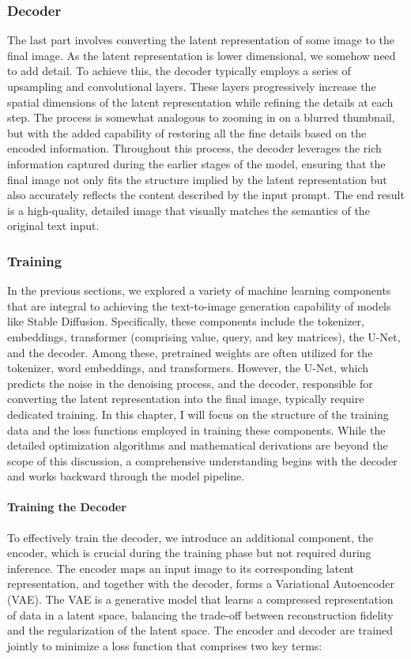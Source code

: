 \documentclass[11pt]{article}
\begin{document}
\subsubsection{Decoder}
The last part involves converting the latent representation of some image to the final image. As the latent representation is lower dimensional, we somehow need to add detail. To achieve this, the decoder typically employs a series of upsampling and convolutional layers. These layers progressively increase the spatial dimensions of the latent representation while refining the details at each step. The process is somewhat analogous to zooming in on a blurred thumbnail, but with the added capability of restoring all the fine details based on the encoded information.
Throughout this process, the decoder leverages the rich information captured during the earlier stages of the model, ensuring that the final image not only fits the structure implied by the latent representation but also accurately reflects the content described by the input prompt. The end result is a high-quality, detailed image that visually matches the semantics of the original text input.


\subsubsection{Training}
\label{sec:stabel_diffusion:training}
In the previous sections, we explored a variety of machine learning components that are integral to achieving the text-to-image generation capability of models like Stable Diffusion. Specifically, these components include the tokenizer, embeddings, transformer (comprising value, query, and key matrices), the U-Net, and the decoder. Among these, pretrained weights are often utilized for the tokenizer, word embeddings, and transformers. However, the U-Net, which predicts the noise in the denoising process, and the decoder, responsible for converting the latent representation into the final image, typically require dedicated training. In this chapter, I will focus on the structure of the training data and the loss functions employed in training these components. While the detailed optimization algorithms and mathematical derivations are beyond the scope of this discussion, a comprehensive understanding begins with the decoder and works backward through the model pipeline.

\paragraph{Training the Decoder}
To effectively train the decoder, we introduce an additional component, the encoder, which is crucial during the training phase but not required during inference. The encoder maps an input image to its corresponding latent representation, and together with the decoder, forms a Variational Autoencoder (VAE)\cite{kingma2022autoencodingvariationalbayes}. The VAE is a generative model that learns a compressed representation of data in a latent space, balancing the trade-off between reconstruction fidelity and the regularization of the latent space. The encoder and decoder are trained jointly to minimize a loss function that comprises two key terms:
\end{document}
